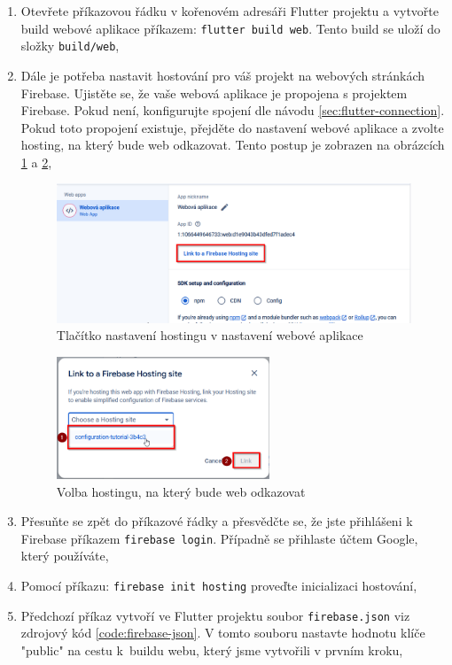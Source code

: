 \documentclass[czech, bc, kiv, he, iso690numb]{fasthesis}
\begin{document}
\begin{enumerate}[label=\arabic*.]
    \item Otevřete příkazovou řádku v kořenovém adresáři Flutter projektu a vytvořte build webové aplikace příkazem: \texttt{flutter build web}. \newline Tento build se uloží do složky \texttt{build/web}, 
    \item Dále je potřeba nastavit hostování pro váš projekt na webových stránkách Firebase. Ujistěte se, že vaše webová aplikace je propojena s projektem Firebase. Pokud není, konfigurujte spojení dle návodu \ref{sec:flutter-connection}. Pokud toto propojení existuje, přejděte do nastavení webové aplikace a zvolte hosting, na který bude web odkazovat. Tento postup je zobrazen na obrázcích \ref{fig:enabling-hosting} a \ref{fig:link-hosting-web},
    \begin{figure}[h!]
  \centering
  \includegraphics[width=1\textwidth]{img/BP-Runt/firebase-configuration/hosting/Firebase-enable-hosting.png}
  \caption{Tlačítko nastavení hostingu v nastavení webové aplikace}
  \label{fig:enabling-hosting}
\end{figure}
\begin{figure}[h!]
  \centering
  \includegraphics[width=0.6\textwidth]{img/BP-Runt/firebase-configuration/hosting/Link-to-hosting-site.png}
  \caption{Volba hostingu, na který bude web odkazovat}
  \label{fig:link-hosting-web}
\end{figure}

\item Přesuňte se zpět do příkazové řádky a přesvědčte se, že jste přihlášeni k Firebase příkazem \texttt{firebase login}. Případně se přihlaste účtem Google, který používáte,
\item Pomocí příkazu: \texttt{firebase init hosting} proveďte inicializaci hostování, 
\item Předchozí příkaz vytvoří ve Flutter projektu soubor \texttt{firebase.json} viz zdrojový kód \ref{code:firebase-json}. V tomto souboru nastavte hodnotu klíče "public" na cestu k~buildu webu, který jsme vytvořili v prvním kroku,


\end{enumerate}
\end{document}
